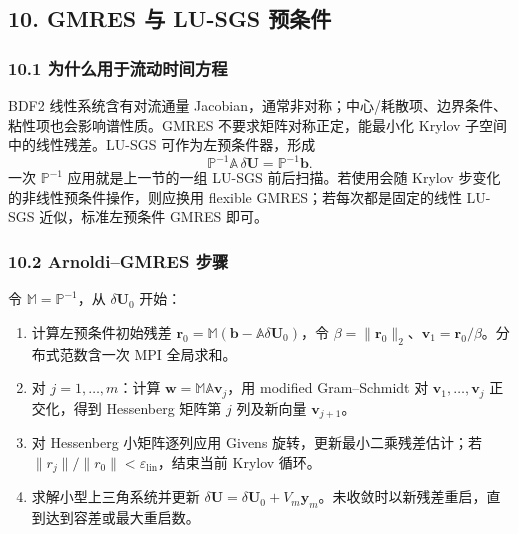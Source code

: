 \documentclass[
  12pt,
  UTF8]{ctexart}
\providecommand{\tightlist}{%
  \setlength{\itemsep}{0pt}\setlength{\parskip}{0pt}}
\begin{document}
\hypertarget{gmres-ux4e0e-lu-sgs-ux9884ux6761ux4ef6}{%
\subsection{10. GMRES 与 LU-SGS
预条件}\label{gmres-ux4e0e-lu-sgs-ux9884ux6761ux4ef6}}

\hypertarget{ux4e3aux4ec0ux4e48ux7528ux4e8eux6d41ux52a8ux65f6ux95f4ux65b9ux7a0b}{%
\subsubsection{10.1
为什么用于流动时间方程}\label{ux4e3aux4ec0ux4e48ux7528ux4e8eux6d41ux52a8ux65f6ux95f4ux65b9ux7a0b}}

BDF2 线性系统含有对流通量
Jacobian，通常非对称；中心/耗散项、边界条件、粘性项也会影响谱性质。GMRES
不要求矩阵对称正定，能最小化 Krylov 子空间中的线性残差。LU-SGS
可作为左预条件器，形成 \begin{equation}
\mathbb P^{-1}\mathbb A\,\delta\boldsymbol U=
\mathbb P^{-1}\boldsymbol b.\end{equation} 一次 \(\mathbb P^{-1}\) 应用就是上一节的一组 LU-SGS
前后扫描。若使用会随 Krylov 步变化的非线性预条件操作，则应换用 flexible
GMRES；若每次都是固定的线性 LU-SGS 近似，标准左预条件 GMRES 即可。

\hypertarget{arnoldigmres-ux6b65ux9aa4}{%
\subsubsection{10.2 Arnoldi--GMRES
步骤}\label{arnoldigmres-ux6b65ux9aa4}}

令 \(\mathbb M=\mathbb P^{-1}\)，从 \(\delta\boldsymbol U_0\) 开始：

\begin{enumerate}
\def\labelenumi{\arabic{enumi}.}
\tightlist
\item
  计算左预条件初始残差
  \(\boldsymbol r_0=\mathbb M(\boldsymbol b-\mathbb A\delta\boldsymbol U_0)\)，令
  \(\beta=\|\boldsymbol r_0\|_2\)、\(\boldsymbol v_1=\boldsymbol r_0/\beta\)。分布式范数含一次
  MPI 全局求和。
\item
  对 \(j=1,\ldots,m\)：计算
  \(\boldsymbol w=\mathbb M\mathbb A\boldsymbol v_j\)，用 modified
  Gram--Schmidt 对 \(\boldsymbol v_1,\ldots,\boldsymbol v_j\)
  正交化，得到 Hessenberg 矩阵第 \(j\) 列及新向量
  \(\boldsymbol v_{j+1}\)。
\item
  对 Hessenberg 小矩阵逐列应用 Givens 旋转，更新最小二乘残差估计；若
  \(\|r_j\|/\|r_0\|<\varepsilon_{\mathrm{lin}}\)，结束当前 Krylov 循环。
\item
  求解小型上三角系统并更新
  \(\delta\boldsymbol U=\delta\boldsymbol U_0+V_m\boldsymbol y_m\)。未收敛时以新残差重启，直到达到容差或最大重启数。
\end{enumerate}
\end{document}
